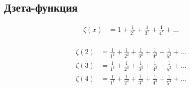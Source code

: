 \subsection{Дзета-функция} %

\begin{equation*}
\begin{aligned}
\zeta(x) &= 1 + \frac{1}{2^x} + \frac{1}{3^x} + \frac{1}{4^x} + \ldots \\
\end{aligned}
\end{equation*}

\begin{equation*}
\begin{aligned}
\zeta(2) &= 
  \frac{1}{1^2}
+ \frac{1}{2^2} 
+ \frac{1}{3^2} 
+ \frac{1}{4^2}
+ \frac{1}{5^2} 
+ \ldots 
\\
\zeta(3) &= 
  \frac{1}{1^3}
+ \frac{1}{2^3} 
+ \frac{1}{3^3} 
+ \frac{1}{4^3}
+ \frac{1}{5^3} 
+ \ldots 
\\
\zeta(4) &= 
  \frac{1}{1^4}
+ \frac{1}{2^4} 
+ \frac{1}{3^4} 
+ \frac{1}{4^4}
+ \frac{1}{5^4} 
+ \ldots 
\\
\end{aligned}
\end{equation*}